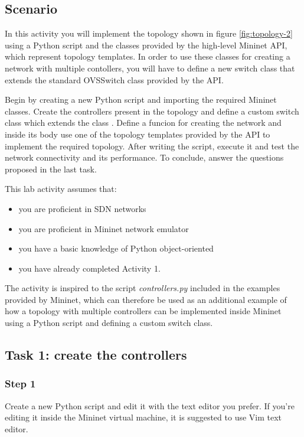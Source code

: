 \subsection*{Scenario}
In this activity you will implement the topology shown in figure \ref{fig:topology-2} using
a Python script and the classes provided by the high-level Mininet API, which
represent topology templates. In order to use these classes for creating a network
with multiple contollers, you will have to define a new switch class that extends
the standard OVSSwitch class provided by the API.

Begin by creating a new Python script and importing the required Mininet classes.
Create the controllers present in the topology and define
a custom switch class which extends the class . Define a funcion for creating
the network and inside its body use one of the topology templates provided
by the API to implement the required topology.
After writing the script, execute it and test the network connectivity and its
performance. To conclude, answer the questions proposed in the last task.

This lab activity assumes that:
\begin{itemize}
  \item you are proficient in SDN networks
  \item you are proficient in Mininet network emulator
  \item you have a basic knowledge of Python object-oriented
  \item you have already completed Activity 1.
\end{itemize}

The activity is inspired to the script \textit{controllers.py} \cite{ref-6} included in the
examples provided by Mininet, which can therefore be used as
an additional example of how a topology with multiple controllers can be implemented
inside Mininet using a Python script and defining a custom switch class.





\subsection*{Task 1: create the controllers}
\subsubsection*{Step 1}
Create a new Python script and edit it with the text editor you prefer. If you're editing
it inside the Mininet virtual machine, it is suggested to use Vim text editor.

